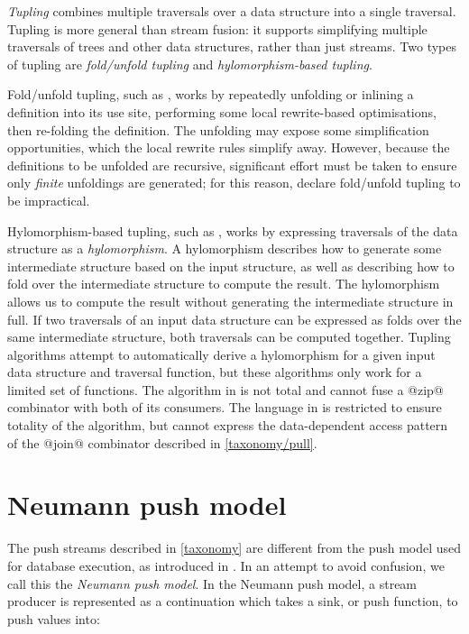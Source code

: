 \emph{Tupling} combines multiple traversals over a data structure into a single traversal.
Tupling is more general than stream fusion: it supports simplifying multiple traversals of trees and other data structures, rather than just streams.
Two types of tupling are \emph{fold/unfold tupling} and \emph{hylomorphism-based tupling}.

Fold/unfold tupling, such as \citet{chiba2010program}, works by repeatedly unfolding or inlining a definition into its use site, performing some local rewrite-based optimisations, then re-folding the definition.
The unfolding may expose some simplification opportunities, which the local rewrite rules simplify away.
However, because the definitions to be unfolded are recursive, significant effort must be taken to ensure only \emph{finite} unfoldings are generated; for this reason, \citet{hu1997tupling} declare fold/unfold tupling to be impractical.

Hylomorphism-based tupling, such as \citet{hu1996cheap}, works by expressing traversals of the data structure as a \emph{hylomorphism}.
A hylomorphism describes how to generate some intermediate structure based on the input structure, as well as describing how to fold over the intermediate structure to compute the result.
The hylomorphism allows us to compute the result without generating the intermediate structure in full.
If two traversals of an input data structure can be expressed as folds over the same intermediate structure, both traversals can be computed together.
Tupling algorithms attempt to automatically derive a hylomorphism for a given input data structure and traversal function, but these algorithms only work for a limited set of functions.
The algorithm in \citet{launchbury1995warm} is not total and cannot fuse a @zip@ combinator with both of its consumers.
The language in \citet{hu1996deriving} is restricted to ensure totality of the algorithm, but cannot express the data-dependent access pattern of the @join@ combinator described in \cref{taxonomy/pull}.


\section{Neumann push model}
\label{related/push-model}

The push streams described in \cref{taxonomy} are different from the push model used for database execution, as introduced in \citet{neumann2011efficiently}.
In an attempt to avoid confusion, we call this the \emph{Neumann push model}.
In the Neumann push model, a stream producer is represented as a continuation which takes a sink, or push function, to push values into:

